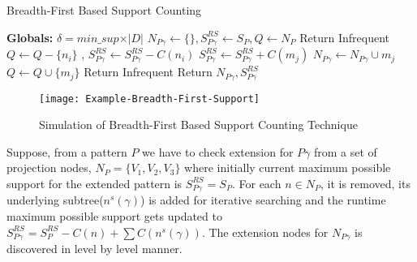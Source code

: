 \begin{algorithm}[!t]
           \scriptsize %
            \caption{Breadth-First Based Support Counting}
            \label{algorithm:breadth_first_support}
        \begin{algorithmic}[1]
            \State \textbf{Globals: }$\delta = min\_sup \times \vert D \vert$
                \State {} 
                \State $N_{P\gamma} \gets \{\},S^{RS}_{P\gamma} \gets S_{P},Q \gets N_{P}$ 
                 \State {}
                    \State Return Infrequent
                    \EndIf
                    \State {}
                    \State $Q \gets Q - \{n_{i}\}$ , $S^{RS}_{P\gamma} \gets S^{RS}_{P\gamma}-C(n_{i})$
                        \State {}
                        \State $S^{RS}_{P\gamma} \gets S^{RS}_{P\gamma}+C(m_{j})$ 
                            \State $N_{P\gamma} \gets  N_{P\gamma} \cup m_{j}$
                        \Else  {}
                            \State $Q \gets Q \cup \{m_{j}\}$
                        \EndIf
                    \EndFor
                     Return Infrequent
                    \EndIf
                \EndFor
                \State Return $N_{P\gamma},S^{RS}_{P\gamma}$ 
            \EndProcedure
        \end{algorithmic}
    \end{algorithm}
    
\begin{figure*}[!t]
\centering
\texttt{[image: Example-Breadth-First-Support]}
\caption{Simulation of Breadth-First Based Support Counting Technique} \label{figure:breadth_first_technique_example}
\hfil
\end{figure*}
    
\begin{lem}\label{lem:bfs_prune}
  Suppose, from a pattern $P$ we have to check extension for $P\gamma$ from a set of projection nodes, $N_{P}=\{V_{1},V_{2},V_{3}\}$ where initially current maximum possible support for the extended pattern is $S_{P\gamma}^{RS}=S_{P}$. For each $n \in N_{P}$, it is removed, its underlying subtree($n^{s}(\gamma)$) is added for iterative searching and the runtime maximum possible support gets updated to $S^{RS}_{P\gamma}=S_{P}^{RS}-C(n)+\sum C(n^{s}(\gamma))$. The extension nodes for $N_{P\gamma}$ is discovered in level by level manner.
\end{lem}

